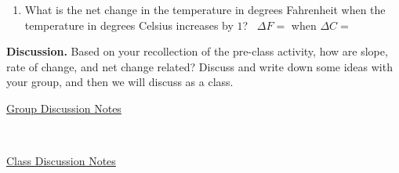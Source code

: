 \documentclass[10pt]{article}
\begin{document}
\begin{enumerate}
\begin{enumerate}
            \,\hfill
            {\Large AROC $=\frac{\Delta F}{\Delta C}=$    }
            \hfill\,\\

        \item[iii.] What is the net change in the temperature in degrees Fahrenheit when the temperature in degrees Celsius increases by $1$?
            \,\hfill
            {\Large $\Delta F=$ when $\Delta C=$   }
            \hfill\,\\
            
        \end{enumerate}
    \end{enumerate}
    \newpage
{\bf\color{blue}Discussion.} Based on your recollection of the pre-class activity, how are slope, rate of change, and net change related? Discuss and write down some ideas with your group, and then we will discuss as a class.\\ 
    \begin{minipage}[t][1.25in]{0.48\textwidth}
    \underline{Group Discussion Notes}
    \end{minipage}
    \,\vline \,
    \begin{minipage}[t][1.25in]{0.48\textwidth}
    \underline{Class Discussion Notes}
    \end{minipage}
    \hfill
\end{document}
